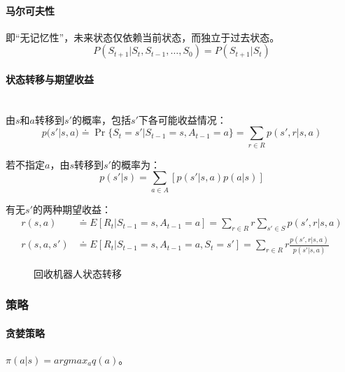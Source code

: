 \documentclass[
12pt, %
a4paper, 
oneside, %
headinclude,footinclude, %
]{scrartcl}
\begin{document}
\paragraph{马尔可夫性}
即“无记忆性”，未来状态仅依赖当前状态，而独立于过去状态。
$$ P(S_{t + 1}|S_t, S_{t - 1}, \dots, S_0) = P(S_{t + 1}|S_t) $$
\paragraph{状态转移与期望收益}~\\

由$ s $和$ a $转移到$ s' $的概率，包括$ s' $下各可能收益情况：
$$ p(s'|s, a) \doteq \Pr\{S_t = s'|S_{t - 1} = s, A_{t - 1} = a\} = \sum_{r \in R} p(s', r|s, a) $$

若不指定$ a $，由$ s $转移到$ s' $的概率为：
$$ p(s'|s) = \sum_{a \in A} [p(s'|s, a)p(a|s)] $$

有无$ s' $的两种期望收益：
\begin{align*}
r(s, a) &\doteq E[R_t|S_{t - 1} = s, A_{t - 1} = a] = \sum_{r \in R} r \sum_{s' \in S} p(s', r|s, a) \\
r(s, a, s') &\doteq E[R_t|S_{t - 1} = s, A_{t - 1} = a, S_t = s'] = \sum_{r \in R} r \frac{p(s', r|s, a)}{p(s'|s, a)}  
\end{align*}

\begin{figure}[H]
\centering
{} \quad
{}
\caption{回收机器人状态转移}
\end{figure}
\subsubsection[策略]{策略}
\paragraph{贪婪策略}
$ \pi(a|s) = argmax_a q(a) $。
\end{document}
